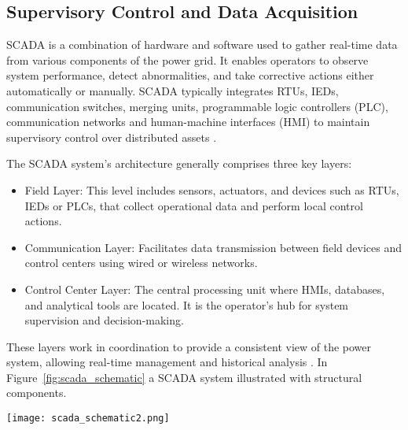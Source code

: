 \subsection{Supervisory Control and Data Acquisition}\label{subsec:ch1/sec2/sub1}

SCADA is a combination of hardware and software used to gather real-time data from various components of the power grid. It enables operators to observe system performance, detect abnormalities, and take corrective actions either automatically or manually. SCADA typically integrates RTUs, IEDs, communication switches, merging units, programmable logic controllers (PLC), communication networks and human-machine interfaces (HMI) to maintain supervisory control over distributed assets \autocite{en12061084}. 


The SCADA system's architecture generally comprises three key layers:
\begin{itemize}
    \item Field Layer: This level includes sensors, actuators, and devices such as RTUs, IEDs or PLCs, that collect operational data and perform local control actions.
    \item Communication Layer: Facilitates data transmission between field devices and control centers using wired or wireless networks.
    \item Control Center Layer: The central processing unit where HMIs, databases, and analytical tools are located. It is the operator's hub for system supervision and decision-making.
\end{itemize}
These layers work in coordination to provide a consistent view of the power system, allowing real-time management and historical analysis \autocite{nist_sp800_82}. In Figure~\cref{fig:scada_schematic} a SCADA system illustrated with structural components.

\begin{figure*}[htbp]
    \centering
    \texttt{[image: scada\_schematic2.png]}
    \caption{Schematic representation of a SCADA system structure in a substation.}
    \label{fig:scada_schematic}
\end{figure*}

